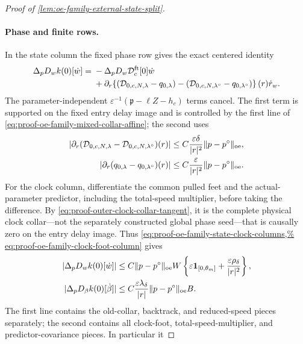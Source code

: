 \begin{proof}[Proof of
\cref{lem:oe-family-external-state-split}]
\paragraph{Phase and finite rows.}
In the state column the fixed phase row gives the exact centered identity
\begin{align}
 \Delta_pD_wk(0)[\dot w]
 ={}&-\Delta_pD_w\mathcal D_c^{\rm ft}[0]\dot w\notag\\
 &+\partial_r\!\left\{
       (\mathcal D_{0,c,N,\lambda}-q_{0,\lambda})
       -(\mathcal D_{0,c,N,\lambda^\circ}
                    -q_{0,\lambda^\circ})\right\}(r)\dot r_w .
                                                        \label{eq:proof-oe-family-mixed-phase-identity}
\end{align}
The parameter-independent
\(\varepsilon^{-1}(\mathfrak p-\ell Z-h_c)\) terms cancel.  The first
term is supported on the fixed entry delay image and is controlled by the
first line of \cref{eq:proof-oe-family-mixed-collar-affine}; the second
uses
\begin{align}
 |\partial_r(\mathcal D_{0,c,N,\lambda}
       -\mathcal D_{0,c,N,\lambda^\circ})(r)|
 &\le C\frac{\varepsilon\delta}{|r|^2}
          \|p-p^\circ\|_{\rm oe},\notag\\
 |\partial_r(q_{0,\lambda}-q_{0,\lambda^\circ})(r)|
 &\le C\frac{\varepsilon}{|r|^2}
          \|p-p^\circ\|_{\rm oe}.             \label{eq:proof-oe-family-mixed-phase-coefficients}
\end{align}
For the clock column, differentiate the common pulled feet and the
actual-parameter predictor, including the total-speed multiplier, before
taking the difference.  By
\cref{eq:proof-outer-clock-collar-tangent}, it is the complete physical
clock collar---not the separately constructed global phase seed---that is
causally zero on the entry delay image.  Thus
\cref{eq:proof-oe-family-state-clock-columns,%
eq:proof-oe-family-clock-foot-column} gives
\begin{align}
 |\Delta_pD_wk(0)[\dot w]|
 &\le C\|p-p^\circ\|_{\rm oe}W
   \left\{
      \varepsilon\mathbf1_{[0,\theta_m]}
      +\frac{\varepsilon\rho_\delta}{|r|^2}
   \right\},\notag\\
 |\Delta_pD_\beta k(0)[\dot\beta]|
 &\le C\frac{\varepsilon\lambda_\delta}{|r|}
       \|p-p^\circ\|_{\rm oe}B.                \label{eq:proof-oe-family-mixed-phase-columns}
\end{align}
The first line contains the old-collar, backtrack, and reduced-speed
pieces separately; the second contains all clock-foot,
total-speed-multiplier, and predictor-covariance pieces.  In particular it

\end{proof}
